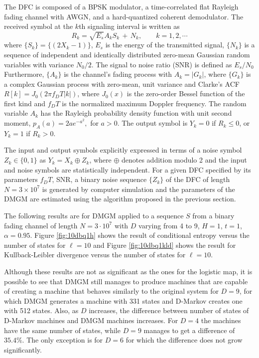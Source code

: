 {The DFC is composed of a BPSK modulator,
a time-correlated flat Rayleigh fading channel with AWGN, and a hard-quantized 
coherent demodulator.  The  received symbol 
 at the $k$th signaling interval 
is written as
\begin{equation*}
R_k = \sqrt{E_s} A_k S_k \, + \, N_k, \quad \quad  k=1,2,\cdots
\end{equation*}
where $\{S_k\} = \{(2 X_k -1)\}$, $E_s$ is the energy of the transmitted 
signal, $\{N_k\}$ is a sequence of independent and 
identically distributed zero-mean Gaussian random variables with variance $N_0/2$. The signal to noise ratio (SNR) is defined as $E_s/N_0$
Furthermore, $\{A_k\}$ is the channel's fading process
with $A_k=|G_k|$, where $\{G_k\}$ is a complex Gaussian process with zero-mean, unit variance and Clarke's ACF~\cite{clarke1968statistical} 
$R[k] = J_0( 2 \pi f_D T |k|)$, where $J_0(x)$ is the zero-order Bessel function of the 
first kind and $f_D T$ is the normalized  maximum Doppler frequency. 
The random variable $A_k$ has the Rayleigh probability density function with unit second moment, 
$p_A(a)= 2ae^{-a^2},$ for $a >0$.
The output symbol is $Y_k=0$ if $R_k\leq 0$, or  $Y_k=1$ if $R_k > 0$.

The input and output symbols explicitly expressed in terms 
of  a noise symbol $Z_k \in \{0,1\}$ as $Y_k=X_k\oplus Z_k$, where $\oplus$ denotes addition modulo 2 and the input and noise symbols are statistically independent.
For a given DFC specified by its parameters $f_D T$, SNR, a binary noise sequence  $\{Z_k\}$ of the DFC of length $N = 3 \times 10^7$ is generated by computer simulation and the parameters of the DMGM are estimated using the algorithm proposed in the previous section.

The following results are for DMGM applied to a sequence $S$ from a binary fading channel of length $N = 3\cdot 10^7$ with $D$ varying from 4 to 9, $H= 1$, $t= 1$, $\alpha = 0.95$. Figure \ref{fig:10dbq1h} shows the result of conditional entropy versus the number of states for $\ell = 10$ and Figure \ref{fig:10dbq1kld} shows the result for Kullback-Leibler divergence versus the number of states for $\ell = 10$.

Although these results are not as significant as the ones for the logistic map, it is possible to see that DMGM still manages to produce machines that are capable of creating a machine that behaves similarly to the original system for $D=9$, for which DMGM generates a machine with 331 states and D-Markov creates one with 512 states. Also, as $D$ increases, the difference between number of states of D-Markov machines and DMGM machines increases. For $D=4$ the machines have the same number of states, while $D=9$ manages to get a difference of $35.4\%$. The only exception is for $D=6$ for which the difference does not grow significantly. 

}
